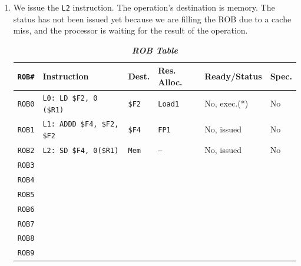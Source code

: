 \begin{enumerate}
    \item We issue the \texttt{L2} instruction. The operation's destination is memory. The status has not been issued yet because we are filling the ROB due to a cache miss, and the processor is waiting for the result of the operation.
    \begin{table}[!htp]
        \centering
        \begin{adjustbox}{width={\textwidth},totalheight={\textheight},keepaspectratio}
            \begin{tabular}{@{} l l l l l l @{}}
                \toprule
                \texttt{ROB\#}  & \textbf{Instruction} & \textbf{Dest.} & \textbf{Res. Alloc.} & \textbf{Ready/Status} & \textbf{Spec.} \\
                \midrule
                \texttt{ROB0}   & \texttt{L0: LD \$F2, 0 (\$R1)}    & \texttt{\$F2} & \texttt{Load1}    & No, exec.(*)  & No    \\ [.3em]
                \texttt{ROB1}   & \texttt{L1: ADDD \$F4, \$F2, \$F2}& \texttt{\$F4} & \texttt{FP1}      & No, issued    & No    \\ [.3em]
                \texttt{ROB2}   & \texttt{L2: SD \$F4, 0(\$R1)}     & \texttt{Mem}  & \texttt{--}       & No, issued    & No    \\ [.3em]
                \texttt{ROB3}   &                                   &               &                   &               &       \\ [.3em]
                \texttt{ROB4}   &                                   &               &                   &               &       \\ [.3em]
                \texttt{ROB5}   &                                   &               &                   &               &       \\ [.3em]
                \texttt{ROB6}   &                                   &               &                   &               &       \\ [.3em]
                \texttt{ROB7}   &                                   &               &                   &               &       \\ [.3em]
                \texttt{ROB8}   &                                   &               &                   &               &       \\ [.3em]
                \texttt{ROB9}   &                                   &               &                   &               &       \\
                \bottomrule
            \end{tabular}
        \end{adjustbox}
        \caption*{\emph{\textbf{ROB Table}}}
    \end{table}


\end{enumerate}
